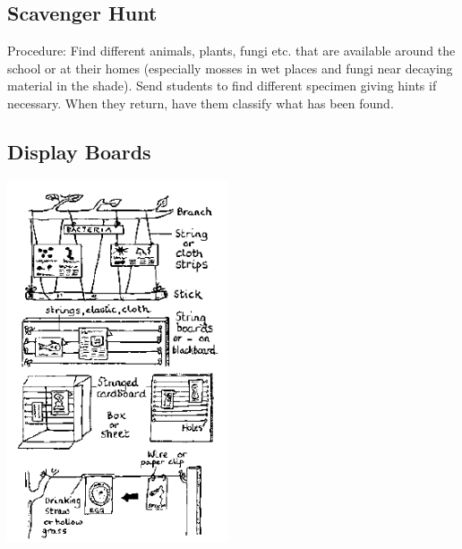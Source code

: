 \begin{multicols}{2}
\subsection{Scavenger Hunt} %


\begin{description*}
\item[Procedure:]{Find different animals, plants, fungi etc. that are available around the school or at their homes (especially mosses in wet places and fungi near decaying material in the shade). Send students to find different specimen giving hints if necessary. When they return, have them classify what has been found.}
\end{description*}

\vfill
\columnbreak

\subsection{Display Boards} %

\begin{center}
\includegraphics[width=0.49\textwidth]{./img/source/displays.png}
\end{center}


\end{multicols}
